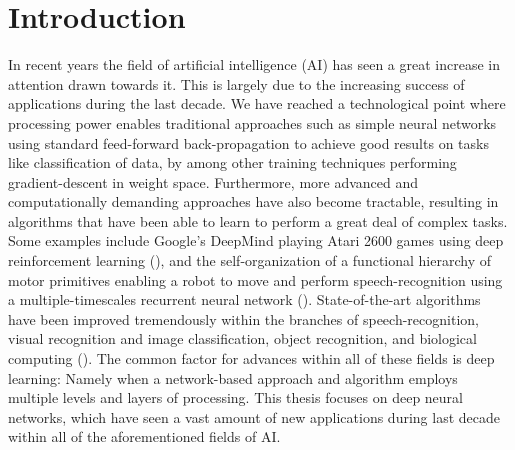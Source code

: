 
\chapter{Introduction}

In recent years the field of artificial intelligence (AI) has seen a great increase in attention drawn towards it. This is largely due to the increasing success of applications during the last decade. We have reached a technological point where processing power enables traditional approaches such as simple neural networks using standard feed-forward back-propagation to achieve good results on tasks like classification of data, by among other training techniques performing gradient-descent in weight space. Furthermore, more advanced and computationally demanding approaches have also become tractable, resulting in algorithms that have been able to learn to perform a great deal of complex tasks. Some examples include Google's DeepMind playing Atari 2600 games using deep reinforcement learning (\cite{Mnih2015}), and the self-organization of a functional hierarchy of motor primitives enabling a robot to move and perform speech-recognition using a multiple-timescales recurrent neural network (\cite{Tani2014}). State-of-the-art algorithms have been improved tremendously within the branches of speech-recognition, visual recognition and image classification, object recognition, and biological computing (\cite{LeCun2015}). The common factor for advances within all of these fields is deep learning: Namely when a network-based approach and algorithm employs multiple levels and layers of processing. This thesis focuses on deep neural networks, which have seen a vast amount of new applications during last decade within all of the aforementioned fields of AI.
\\

